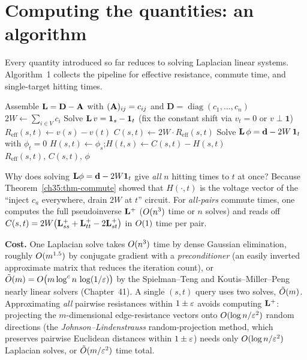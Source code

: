 \section{Computing the quantities: an algorithm}

Every quantity introduced so far reduces to solving Laplacian linear systems. Algorithm~1 collects the pipeline for effective resistance, commute time, and single-target hitting times.

\begin{algorithm}[H]
\DontPrintSemicolon
\caption{Random-walk quantities via Laplacian solves}
Assemble $\mathbf{L}=\mathbf{D}-\mathbf{A}$ with $(\mathbf{A})_{ij}=c_{ij}$ and $\mathbf{D}=\operatorname{diag}(c_1,\dots,c_n)$\;
$2W \leftarrow \sum_{i\in V} c_i$ 
Solve $\mathbf{L}\,v=\mathbf{1}_s-\mathbf{1}_t$ (fix the constant shift via $v_t=0$ or $v\perp\mathbf{1}$)\;
$R_{\mathrm{eff}}(s,t)\leftarrow v(s)-v(t)$\;
$C(s,t)\leftarrow 2W\cdot R_{\mathrm{eff}}(s,t)$\;
Solve $\mathbf{L}\,\phi=\mathbf{d}-2W\,\mathbf{1}_t$ with $\phi_t=0$ 
$H(s,t)\leftarrow \phi_s$;\quad $H(t,s)\leftarrow C(s,t)-H(s,t)$\;
\Return $R_{\mathrm{eff}}(s,t),\,C(s,t),\,\phi$\;
\end{algorithm}

\begin{whybox}
Why does solving $\mathbf{L}\phi=\mathbf{d}-2W\mathbf{1}_t$ give \emph{all} $n$ hitting times to $t$ at once? Because Theorem~\ref{ch35:thm-commute} showed that $H(\cdot,t)$ is the voltage vector of the ``inject $c_a$ everywhere, drain $2W$ at $t$'' circuit. For \emph{all-pairs} commute times, one computes the full pseudoinverse $\mathbf{L}^+$ ($O(n^3)$ time or $n$ solves) and reads off $C(s,t)=2W\bigl(\mathbf{L}^+_{ss}+\mathbf{L}^+_{tt}-2\mathbf{L}^+_{st}\bigr)$ in $O(1)$ time per pair.
\end{whybox}

\begin{complexitybox}
\textbf{Cost.} One Laplacian solve takes $O(n^3)$ time by dense Gaussian elimination, roughly $O(m^{1.5})$ by conjugate gradient with a \emph{preconditioner} (an easily inverted approximate matrix that reduces the iteration count), or $\tilde{O}(m)=O\bigl(m\log^{c}n\,\log(1/\varepsilon)\bigr)$ by the Spielman--Teng and Koutis--Miller--Peng nearly linear solvers (Chapter~41). A single $(s,t)$ query uses two solves, $\tilde{O}(m)$. Approximating \emph{all} pairwise resistances within $1\pm\varepsilon$ avoids computing $\mathbf{L}^+$: projecting the $m$-dimensional edge-resistance vectors onto $O(\log n/\varepsilon^2)$ random directions (the \emph{Johnson--Lindenstrauss} random-projection method, which preserves pairwise Euclidean distances within $1\pm\varepsilon$) needs only $O(\log n/\varepsilon^2)$ Laplacian solves, or $\tilde{O}(m/\varepsilon^2)$ time total.
\end{complexitybox}

